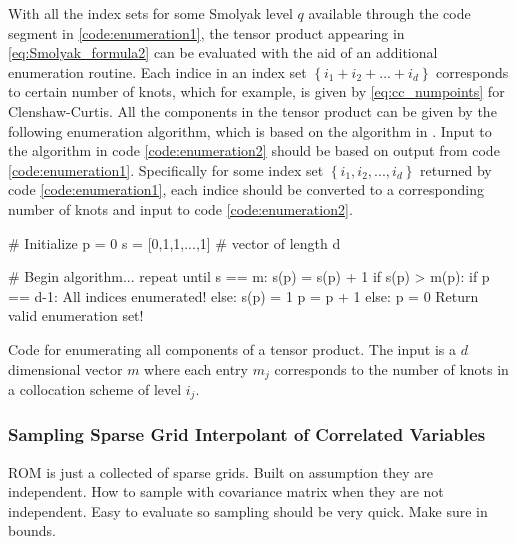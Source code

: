 With all the index sets for some Smolyak level $q$ available through the code segment in \ref{code:enumeration1}, the tensor product appearing in \ref{eq:Smolyak_formula2} can be evaluated with the aid of an additional enumeration routine. Each indice in an index set $\left\{i_1+i_2+...+i_d\right\}$ corresponds to certain number of knots, which for example, is given by \ref{eq:cc_numpoints} for Clenshaw-Curtis. All the components in the tensor product can be given by the following enumeration algorithm, which is based on the algorithm in \cite{Holtz}. Input to the algorithm in code \ref{code:enumeration2} should be based on output from code \ref{code:enumeration1}. Specifically for some index set $\left\{i_1,i_2,...,i_d\right\}$ returned by code \ref{code:enumeration1}, each indice should be converted to a corresponding number of knots and input to code \ref{code:enumeration2}.     
\begin{program} 
\begin{code}
   # Initialize
   p = 0
   s = [0,1,1,...,1]  # vector of length d 

   # Begin algorithm...
   repeat until s == m: 
      s(p) = s(p) + 1
      if s(p) > m(p):
         if p == d-1:
            All indices enumerated!
         else:
            s(p) = 1
            p = p + 1
      else:
         p = 0
         Return valid enumeration set!
\end{code}
\caption{\label{code:enumeration2} 
Code for enumerating all components of a tensor product. The input is a $d$ dimensional vector $m$ where each entry $m_j$ corresponds to the number of knots in a collocation scheme of level $i_j$.}  
\end{program}

\subsubsection{Sampling Sparse Grid Interpolant of Correlated Variables} \label{subsubsec:sampling_smolyak}

ROM is just a collected of sparse grids. Built on assumption they are independent. How to sample with covariance matrix when they are not independent. Easy to evaluate so sampling should be very quick. Make sure in bounds. 

